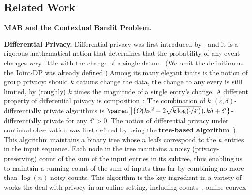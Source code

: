 \documentclass{article}
\DeclarePairedDelimiter{\paren}()
\renewcommand{\paragraph}[1]{\vspace{2pt}\noindent\textbf{#1}}
\begin{document}
\subsection{Related Work}
\label{subsec:related_work}

\paragraph{MAB and the Contextual Bandit Problem.}

\paragraph{Differential Privacy.} Differential privacy was first introduced by
\citet{DworkCalibratingNoiseSensitivity2006,DworkOurData2006}, and it is a rigorous mathematical notion that determines that the probability of any event changes very little with the change of a single datum. (We omit the definition as the Joint-DP was already defined.) 
Among its many elegant traits is the notion of group privacy: should $k$ datums change the data, the change to any every is still limited, by (roughly) $k$ times the magnitude of a single entry's change. A different property of differential privacy is composition~\cite{DworkBoosting2010}: The combination of $k$ $(\varepsilon,\delta)$-differentially private algorithms is $\paren[\big]{O(k\varepsilon^2 + 2\sqrt{k\log(\nicefrac 1 {\delta'})}), k\delta+\delta'}$-differentially private for any $\delta'>0$.
%
The notion of differential privacy under continual observation was
first defined by \citet{DworkContinualObservation2010} using the \textbf{tree-based algorithm}~\citep[originally
appearing in][]{ChanPrivateContinualRelease2010}). This algorithm
maintains a binary tree whose $n$ leafs correspond to the $n$ entries
in the input sequence. Each node in the tree maintains a noisy
(privacy-preserving) count of the sum of the input entries in its
subtree, thus enabling us to maintain a running count of the sum of
inputs thus far by combining no more than $\log(n)$ noisy counts. This
algorithm is the key ingredient in a variety of works the deal with
privacy in an online setting, including
counts~\cite{DworkContinualObservation2010}, online convex
\end{document}
